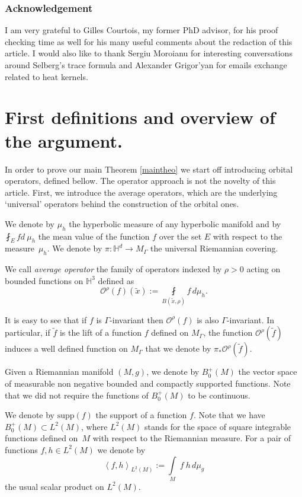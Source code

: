 \documentclass[JEP,XML,SOM,Unicode,NoFloatCountersInSection,published]{cedram}
\let\mathcal\mathscr
\theoremstyle{plain}
\theoremstyle{definition}
\newcommand{\HH}{\mathbb{H}}
\newcommand{\inte}[1]{\underset{#1}{\int}}
\newcommand{\finte}[3]{\underset{#1}{\fint} {#2} \, {#3}}
\newcommand{\supp}[1]{\mathrm{supp}(#1)}
\begin{document}
\subsubsection*{Acknowledgement} I am very grateful to Gilles Courtois, my former PhD advisor, for his proof checking time as well for his many useful comments about the redaction of this article. I would also like to thank Sergiu Moroianu for interesting conversations around Selberg's trace formula and Alexander Grigor'yan for emails exchange related to heat kernels.

\section{First definitions and overview of the argument.}
\label{secoverview}
In order to prove our main Theorem \ref{maintheo} we start off introducing orbital operators, defined bellow. The operator approach is not the novelty of this article. First, we introduce the average operators, which are the underlying `universal' operators behind the construction of the orbital ones.

We denote by $\mu_h$ the hyperbolic measure of any hyperbolic manifold and by $\fint_{E} f d \ \mu_h $ the mean value of the function $f$ over the set $E$ with respect to the measure~$\mu_h$. We denote by $\pi : \HH^d \to M_{\Gamma}$ the universal Riemannian covering.

We call \emph{average operator} the family of operators indexed by $\rho > 0$ acting on bounded functions on $\HH^3$ defined as
\[
\mathcal{O}^{\rho}(f)(\tilde{x}) := \finte{B(\tilde{x},\rho)}{f}{ d \mu_h}.
\]

It is easy to see that if $f$ is $\Gamma$-invariant then $\mathcal{O}^{\rho}(f)$ is also $\Gamma$-invariant. In particular, if $\tilde{f}$ is the lift of a function $f$ defined on $M_{\Gamma}$, the function $\mathcal{O}^{\rho}(\tilde{f})$ induces a well defined function on $M_{\Gamma}$ that we denote by $\pi_*\mathcal{O}^{\rho}(\tilde{f})$.

Given a Riemannian manifold $(M,g)$, we denote by $B^+_0(M)$ the vector space of measurable non negative bounded and compactly supported functions. Note that we did not require the functions of $B^+_0(M)$ to be continuous.

We denote by $\supp{f}$ the support of a function $f$. Note that we have $B^+_0(M) \subset L^2(M)$, where $L^2(M)$ stands for the space of square integrable functions defined on~$M$ with respect to the Riemannian measure. For a pair of functions $f,h \in L^2(M)$ we denote by
\[
\left<f,h \right>_{L^2(M)} := \inte{M} \ f \ h \,d\mu_g
\]
the usual scalar product on $L^2(M)$.
\end{document}
